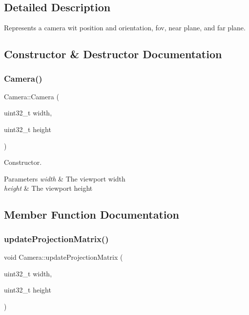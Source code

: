 \subsection{Detailed Description}
Represents a camera wit position and orientation, fov, near plane, and far plane. 

\subsection{Constructor \& Destructor Documentation}
\mbox{\label{class_camera_a4bb1853b56a6a3ca92432e5db0d7f375}} 
\subsubsection{\texorpdfstring{Camera()}{Camera()}}
{\footnotesize\ttfamily Camera\+::\+Camera (\begin{DoxyParamCaption}\item[{uint32\+\_\+t}]{width,  }\item[{uint32\+\_\+t}]{height }\end{DoxyParamCaption})\hspace{0.3cm}{\ttfamily [inline]}}



Constructor. 


\begin{DoxyParams}{Parameters}
{\em width} & The viewport width \\
\hline
{\em height} & The viewport height \\
\hline
\end{DoxyParams}


\subsection{Member Function Documentation}
\mbox{\label{class_camera_a899a715cd940bf80eb157f0e63f4c06b}} 
\subsubsection{\texorpdfstring{updateProjectionMatrix()}{updateProjectionMatrix()}}
{\footnotesize\ttfamily void Camera\+::update\+Projection\+Matrix (\begin{DoxyParamCaption}\item[{uint32\+\_\+t}]{width,  }\item[{uint32\+\_\+t}]{height }\end{DoxyParamCaption})\hspace{0.3cm}{\ttfamily [inline]}}



